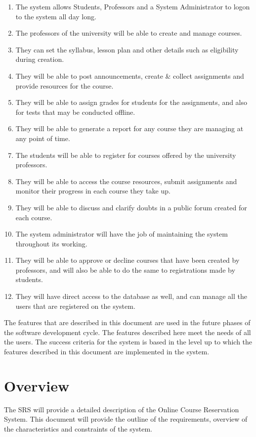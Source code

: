 \documentclass[12pt, a4]{report}
\begin{document}
\begin{enumerate}
    \item The system allows Students, Professors and a System Administrator to logon to the system all day long.
    \item The professors of the university will be able to create and manage courses.
    \item They can set the syllabus, lesson plan and other details such as eligibility during creation.
    \item They will be able to post announcements, create \& collect assignments and provide resources for the course.
    \item They will be able to assign grades for students for the assignments, and also for tests that may be conducted offline.
    \item They will be able to generate a report for any course they are managing at any point of time.
    \item The students will be able to register for courses offered by the university professors.
    \item They will be able to access the course resources, submit assignments and monitor their progress in each course they take up.
    \item They will be able to discuss and clarify doubts in a public forum created for each course.
    \item The system administrator will have the job of maintaining the system throughout its working.
    \item They will be able to approve or decline courses that have been created by professors, and will also be able to do the same to registrations made by students.
    \item They will have direct access to the database as well, and can manage all the users that are registered on the system.
\end{enumerate}

The features that are described in this document are used in the future phases of the software development cycle. The features described here meet the needs of all the users. The success criteria for the system is based in the level up to which the features described in this document are implemented in the system.


\section{Overview}
The SRS will provide a detailed description of the Online Course Reservation System. This document will provide the outline of the requirements, overview of the characteristics and constraints of the system.
\end{document}
